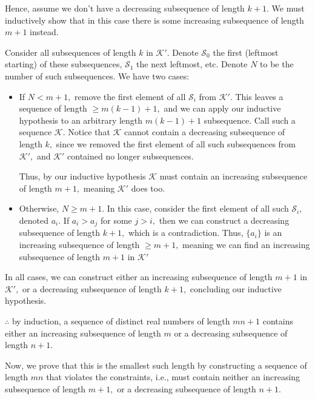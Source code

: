 \documentclass[12pt]{article}
\begin{document}
\begin{enumerate}
    Hence, assume we don't have a decreasing subsequence of length $k
    + 1.$ We must inductively show that in this case there is some
    increasing subsequence of length $m + 1$ instead.

    Consider all subsequences of length $k$ in $\mathcal K'.$ Denote
    $\mathcal S_0$ the first (leftmost starting) of these
    subsequences, $\mathcal S_1$ the next leftmost, etc. Denote $N$
    to be the number of such subsequences. We have two cases:
    \begin{itemize}
      \item If $N < m + 1,$ remove the first element of all $\mathcal
        S_i$ from $\mathcal K'.$ This leaves a sequence of length
        $\geq m(k -1) + 1,$ and we can apply our inductive hypothesis
        to an arbitrary length $m(k-1) + 1$ subsequence. Call such a
        sequence $\mathcal K.$ Notice that $\mathcal K$ cannot
        contain a decreasing subsequence of length $k,$ since we
        removed the first element of all such subsequences from
        $\mathcal K',$ and $\mathcal K'$ contained no longer subsequences.

        Thus, by our inductive hypothesis $\mathcal K$ must contain
        an increasing subsequence of length $m + 1,$ meaning
        $\mathcal K'$ does too.

      \item Otherwise, $N \geq m + 1.$ In this case, consider the
        first element of all such $\mathcal S_i,$ denoted $a_i.$ If
        $a_i > a_j$ for some $j > i,$ then we can construct a
        decreasing subsequence of length $k + 1,$ which is a
        contradiction. Thus, $\{a_i\}$ is an increasing subsequence
        of length $\geq m + 1,$ meaning we can find an increasing
        subsequence of length $m + 1$ in $\mathcal K'$
    \end{itemize}

    In all cases, we can construct either an increasing subsequence
    of length $m + 1$ in $\mathcal K',$ or a decreasing subsequence
    of length $k + 1,$ concluding our inductive hypothesis.

    $\therefore$ by induction, a sequence of distinct real numbers of
    length $mn + 1$ contains either an increasing subsequence of
    length $m$ or a decreasing subsequence of length $n + 1.$

    Now, we prove that this is the smallest such length by
    constructing a sequence of length $mn$ that violates the
    constraints, i.e., must contain neither an increasing subsequence
    of length $m + 1,$ or a decreasing subsequence of length $n + 1.$


\end{enumerate}
\end{document}
